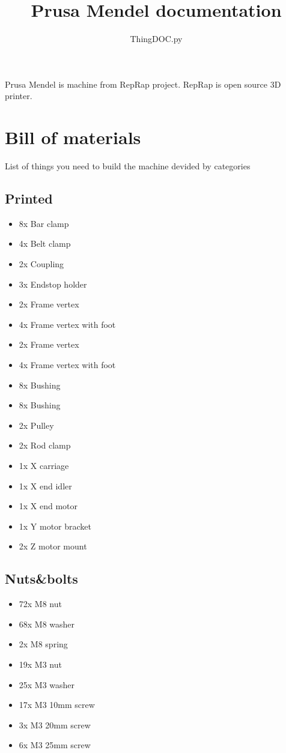 \documentclass[11pt]{article}
\title{Prusa Mendel documentation}
\author{ThingDOC.py}
\begin{document}
\maketitle
Prusa Mendel is machine from RepRap project. RepRap is open source 3D printer.
\newpage
\tableofcontents
\newpage
\section{Bill of materials}
List of things you need to build the machine devided by categories
\subsection{Printed}
\begin{itemize}
\item 8x Bar clamp
\item 4x Belt clamp
\item 2x Coupling
\item 3x Endstop holder
\item 2x Frame vertex
\item 4x Frame vertex with foot
\item 2x Frame vertex
\item 4x Frame vertex with foot
\item 8x Bushing
\item 8x Bushing
\item 2x Pulley
\item 2x Rod clamp
\item 1x X carriage
\item 1x X end idler
\item 1x X end motor
\item 1x Y motor bracket
\item 2x Z motor mount
\end{itemize}
\subsection{Nuts\&bolts}
\begin{itemize}
\item 72x M8 nut
\item 68x M8 washer
\item 2x M8 spring
\item 19x M3 nut
\item 25x M3 washer
\item 17x M3 10mm screw
\item 3x M3 20mm screw
\item 6x M3 25mm screw
\end{itemize}
\newpage
\end{document}
